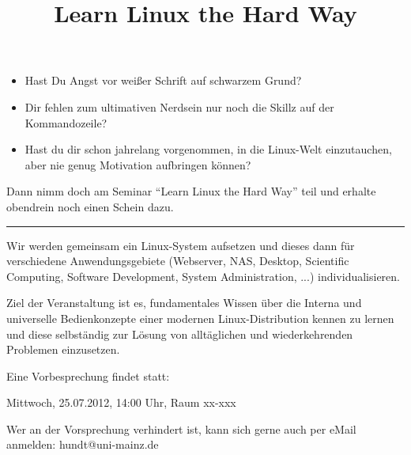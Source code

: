\documentclass[a4paper]{scrartcl}
\title{Learn Linux the Hard Way}
\author{}
\date{}
\begin{document}
\maketitle

\begin{itemize}
    \item Hast Du Angst vor weißer Schrift auf schwarzem Grund?
    \item Dir fehlen zum ultimativen Nerdsein nur noch die Skillz auf der  Kommandozeile?
    \item Hast du dir schon jahrelang vorgenommen, in die Linux-Welt einzutauchen, aber nie genug Motivation aufbringen können?
\end{itemize}

Dann nimm doch am Seminar ``Learn Linux the Hard Way'' teil und erhalte obendrein noch einen Schein dazu.

\noindent\rule{\columnwidth}{0.4pt}

Wir werden gemeinsam ein Linux-System aufsetzen und dieses dann für verschiedene Anwendungsgebiete (Webserver, NAS, Desktop, Scientific Computing, Software Development, System Administration, ...) individualisieren.

Ziel der Veranstaltung ist es, fundamentales Wissen über die Interna und universelle Bedienkonzepte einer modernen Linux-Distribution kennen zu lernen und diese selbständig zur Lösung von alltäglichen und wiederkehrenden Problemen einzusetzen.

\begin{center}
    Eine Vorbesprechung findet statt:
    
    \begin{huge}
        Mittwoch, 25.07.2012, 14:00 Uhr, Raum xx-xxx
    \end{huge}
\end{center}

Wer an der Vorsprechung verhindert ist, kann sich gerne auch per eMail anmelden:
{hundt@uni-mainz.de}
\end{document}
